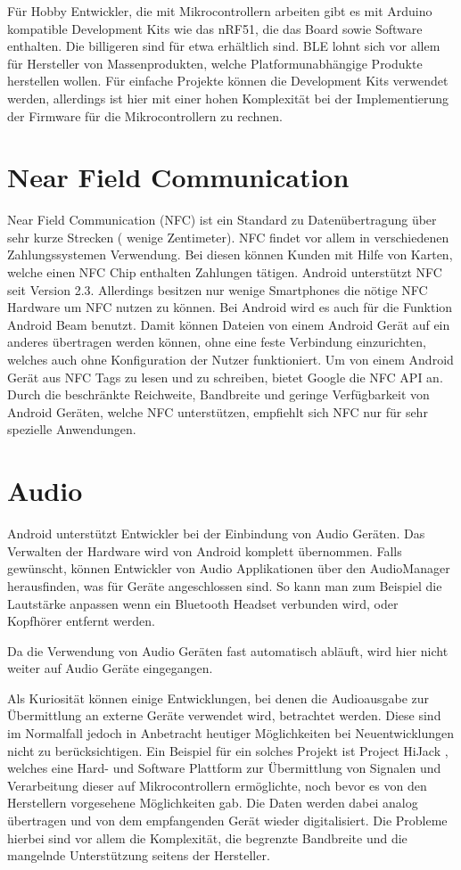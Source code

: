\documentclass[12pt,journal,compsoc]{IEEEtran}
\begin{document}
Für Hobby Entwickler, die mit Mikrocontrollern arbeiten gibt es mit Arduino kompatible Development Kits wie das nRF51, die das Board sowie Software enthalten.
Die billigeren sind für etwa  erhältlich sind.
BLE lohnt sich vor allem für Hersteller von Massenprodukten, welche Platformunabhängige Produkte herstellen wollen.
Für einfache Projekte können die Development Kits verwendet werden, allerdings ist hier mit einer hohen Komplexität bei der Implementierung der Firmware für die Mikrocontrollern zu rechnen.

\section{Near Field Communication}
Near Field Communication (NFC) ist ein Standard zu Datenübertragung über sehr kurze Strecken ( wenige Zentimeter). 
NFC findet vor allem in verschiedenen Zahlungssystemen Verwendung.
Bei diesen können Kunden mit Hilfe von Karten, welche einen NFC Chip enthalten Zahlungen tätigen.
Android unterstützt NFC seit Version 2.3. Allerdings besitzen nur wenige Smartphones die nötige NFC Hardware um NFC nutzen zu können.
Bei Android wird es auch für die Funktion Android Beam benutzt. 
Damit können Dateien von einem Android Gerät auf ein anderes übertragen werden können, ohne eine feste Verbindung einzurichten, welches auch ohne Konfiguration der Nutzer funktioniert.
Um von einem Android Gerät aus NFC Tags zu lesen und zu schreiben, bietet Google die NFC API an.
Durch die beschränkte Reichweite, Bandbreite und geringe Verfügbarkeit von Android Geräten, welche NFC unterstützen, empfiehlt sich NFC nur für sehr spezielle Anwendungen.

\section{Audio}
Android unterstützt Entwickler bei der Einbindung von Audio Geräten. Das Verwalten der Hardware wird von Android komplett übernommen.
Falls gewünscht, können Entwickler von Audio Applikationen über den AudioManager herausfinden, was für Geräte angeschlossen sind. So kann man zum Beispiel die Lautstärke anpassen wenn ein Bluetooth Headset verbunden wird, oder Kopfhörer entfernt werden.

Da die Verwendung von Audio Geräten fast automatisch abläuft, wird hier nicht weiter auf Audio Geräte eingegangen.

Als Kuriosität können einige Entwicklungen, bei denen die Audioausgabe zur Übermittlung an externe Geräte verwendet wird, betrachtet werden.
Diese sind im Normalfall jedoch in Anbetracht heutiger Möglichkeiten bei Neuentwicklungen nicht zu berücksichtigen.  
Ein Beispiel für ein solches Projekt ist Project HiJack \cite{hijack} , welches eine Hard- und Software Plattform zur Übermittlung von Signalen und Verarbeitung dieser auf Mikrocontrollern ermöglichte, noch bevor es von den Herstellern vorgesehene Möglichkeiten gab. 
Die Daten werden dabei analog übertragen und von dem empfangenden Gerät wieder digitalisiert.
Die Probleme hierbei sind vor allem die Komplexität, die begrenzte Bandbreite und die mangelnde Unterstützung seitens der Hersteller.
\end{document}
